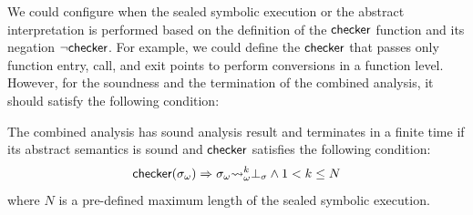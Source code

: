 We could configure when the sealed symbolic execution or the abstract
interpretation is performed based on the definition of the $\textsf{checker}$ function
and its negation $\neg\textsf{checker}$.  For example, we could define the $\textsf{checker}$
that passes only function entry, call, and exit points to perform conversions in
a function level.  However, for the soundness and the termination of the
combined analysis, it should satisfy the following condition:
\begin{theorem}
  The combined analysis has sound analysis result and terminates in a finite
  time if its abstract semantics is sound and $\textsf{checker}$ satisfies the following
  condition:
  \[
    \textsf{checker}({\sigma}_\omega) \Rightarrow {\sigma}_\omega {\leadsto}_\omega^k \bot_\sigma \wedge
    1 < k \leq N
  \]
  where $N$ is a pre-defined maximum length of the sealed symbolic execution.
\end{theorem}
